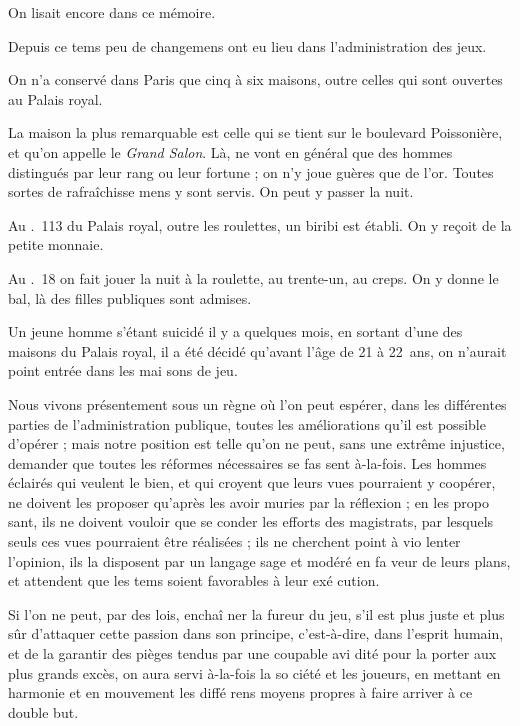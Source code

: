 On lisait encore dans ce mémoire.

Depuis ce tems peu de changemens
ont eu lieu dans l'administration des
jeux.

On n'a conservé dans Paris que cinq
à six maisons, outre celles qui sont
ouvertes au Palais royal.

La maison la plus remarquable est
celle qui se tient sur le boulevard
Poissonière, et qu'on appelle le \emph{Grand
Salon}. Là, ne vont en général que des
hommes distingués par leur rang ou
leur fortune ; on n'y joue guères que
de l'or. Toutes sortes de rafraîchisse%
mens y sont servis. On peut y passer
la nuit.

Au \no.~113 du Palais royal, outre
les roulettes, un biribi est établi. On
y reçoit de la petite monnaie.

Au \no.~18 on fait jouer la nuit à la
roulette, au trente-un, au creps. On
y donne le bal, là des filles publiques
sont admises.

Un jeune homme s'étant suicidé il
y a quelques mois, en sortant d'une
des maisons du Palais royal, il a été
décidé qu'avant l'âge de 21 à 22~ans,
on n'aurait point entrée dans les mai%
sons de jeu.

Nous vivons présentement sous un
règne où l'on peut espérer, dans les
différentes parties de l'administration
publique, toutes les améliorations
qu'il est possible d'opérer ; mais notre
position est telle qu'on ne peut, sans
une extrême injustice, demander que
toutes les réformes nécessaires se fas%
sent à-la-fois. Les hommes éclairés qui
veulent le bien, et qui croyent que
leurs vues pourraient y coopérer, ne
doivent les proposer qu'après les avoir
muries par la réflexion ; en les propo%
sant, ils ne doivent vouloir que se%
conder les efforts des magistrats, par
lesquels seuls ces vues pourraient être
réalisées ; ils ne cherchent point à vio%
lenter l'opinion, ils la disposent par
un langage sage et modéré en fa%
veur de leurs plans, et attendent que
les tems soient favorables à leur exé%
cution.

Si l'on ne peut, par des lois, enchaî%
ner la fureur du jeu, s'il est plus juste
et plus sûr d'attaquer cette passion
dans son principe, c'est-à-dire, dans
l'esprit humain, et de la garantir des
pièges tendus par une coupable avi%
dité pour la porter aux plus grands
excès, on aura servi à-la-fois la so%
ciété et les joueurs, en mettant en
harmonie et en mouvement les diffé%
rens moyens propres à faire arriver à
ce double but.

